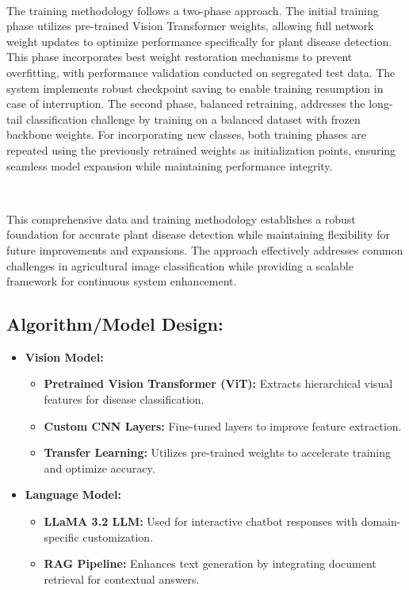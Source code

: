 \

The training methodology follows a two-phase approach. The initial training phase utilizes pre-trained Vision Transformer weights, allowing full network weight updates to optimize performance specifically for plant disease detection. This phase incorporates best weight restoration mechanisms to prevent overfitting, with performance validation conducted on segregated test data. The system implements robust checkpoint saving to enable training resumption in case of interruption. The second phase, balanced retraining, addresses the long-tail classification challenge by training on a balanced dataset with frozen backbone weights. For incorporating new classes, both training phases are repeated using the previously retrained weights as initialization points, ensuring seamless model expansion while maintaining performance integrity.

\

This comprehensive data and training methodology establishes a robust foundation for accurate plant disease detection while maintaining flexibility for future improvements and expansions. The approach effectively addresses common challenges in agricultural image classification while providing a scalable framework for continuous system enhancement.



\subsection{Algorithm/Model Design:}
\begin{itemize}

\item \textbf{Vision Model:}
\begin{itemize}
\item \textbf{Pretrained Vision Transformer (ViT):} Extracts hierarchical visual features for disease classification.
\item \textbf{Custom CNN Layers:} Fine-tuned layers to improve feature extraction.
\item \textbf{Transfer Learning:} Utilizes pre-trained weights to accelerate training and optimize accuracy.
\end{itemize}

\item \textbf{Language Model:}
\begin{itemize}
\item \textbf{LLaMA 3.2 LLM:} Used for interactive chatbot responses with domain-specific customization.
\item \textbf{RAG Pipeline:} Enhances text generation by integrating document retrieval for contextual answers.
\end{itemize}

\end{itemize}

